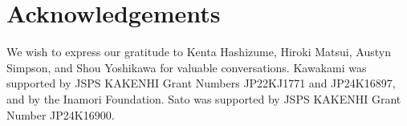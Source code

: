 \documentclass[12pt]{amsart}
\theoremstyle{plain}
\theoremstyle{definition}
\theoremstyle{remark}
\newtheorem{defn and notation}[thm]{Definition and Notation}
\theoremstyle{plain}
\numberwithin{equation}{thm}
\begin{document}
\section*{Acknowledgements}
We wish to express our gratitude to Kenta Hashizume, Hiroki Matsui, Austyn Simpson, and Shou Yoshikawa
for valuable conversations.
Kawakami was supported by JSPS KAKENHI Grant Numbers JP22KJ1771 and JP24K16897, and by the Inamori Foundation.
Sato was supported by JSPS KAKENHI Grant Number JP24K16900.





\bigskip
\end{document}
